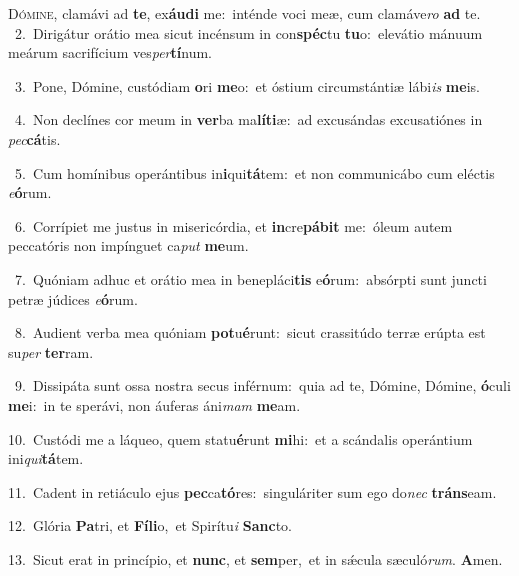\lettrine{\initial\textcolor{\initialcolor}{D}}{ómine,} clamávi ad \textbf{te}\-, ex\-\textbf{áu}\-\textbf{di} me:~\star inténde voci meæ, cum clamáve\textit{ro} \textbf{ad} te.\\
{\numbfont\textcolor{\numbcolor}{~2.}}~Dirigátur orátio mea sicut incénsum in con\-\textbf{spéc}\-tu \textbf{tu}\-o:~\star elevátio mánuum meárum sacrifícium ves\-\textit{per}\-\textbf{tí}num.\par
{\numbfont\textcolor{\numbcolor}{~3.}}~Pone, Dómine, custódiam \textbf{o}\-ri \textbf{me}\-o:~\star et óstium circumstántiæ lábi\textit{is} \textbf{me}\-is.\par
{\numbfont\textcolor{\numbcolor}{~4.}}~Non declínes cor meum in \textbf{ver}\-ba ma\-\textbf{lí}\-\textbf{ti}æ:~\star ad excusándas excusatiónes in \textit{pec}\-\textbf{cá}tis.\par
{\numbfont\textcolor{\numbcolor}{~5.}}~Cum homínibus operántibus in\-\textbf{i}\-qui\-\textbf{tá}\-tem:~\star et non communicábo cum eléctis \textit{e}\-\textbf{ó}rum.\par
{\numbfont\textcolor{\numbcolor}{~6.}}~Corrípiet me justus in misericórdia, et \textbf{in}\-cre\-\textbf{pá}\-\textbf{bit} me:~\star óleum autem peccatóris non impínguet ca\textit{put} \textbf{me}\-um.\par
{\numbfont\textcolor{\numbcolor}{~7.}}~Quóniam adhuc et orátio mea in benepláci\textbf{tis} e\-\textbf{ó}\-rum:~\star absórpti sunt juncti petræ júdices \textit{e}\-\textbf{ó}rum.\par
{\numbfont\textcolor{\numbcolor}{~8.}}~Audient verba mea quóniam \textbf{pot}\-u\-\textbf{é}\-runt:~\star sicut crassitúdo terræ erúpta est su\textit{per} \textbf{ter}\-ram.\par
{\numbfont\textcolor{\numbcolor}{~9.}}~Dissipáta sunt ossa nostra secus inférnum:~\dagger quia ad te, Dómine, Dómine, \textbf{ó}\-culi \textbf{me}\-i:~\star in te sperávi, non áuferas áni\textit{mam} \textbf{me}\-am.\par
{\numbfont\textcolor{\numbcolor}{10.}}~Custódi me a láqueo, quem statu\-\textbf{é}\-runt \textbf{mi}\-hi:~\star et a scándalis operántium ini\-\textit{qui}\-\textbf{tá}tem.\par
{\numbfont\textcolor{\numbcolor}{11.}}~Cadent in retiáculo ejus \textbf{pec}\-ca\-\textbf{tó}\-res:~\star singuláriter sum ego do\textit{nec} \textbf{tráns}\-eam.\par
{\numbfont\textcolor{\numbcolor}{12.}}~Glória \textbf{Pa}\-tri, et \textbf{Fí}\-\textbf{li}o,~\star et Spirítu\textit{i} \textbf{Sanc}\-to.\par
{\numbfont\textcolor{\numbcolor}{13.}}~Sicut erat in princípio, et \textbf{nunc}\-, et \textbf{sem}\-per,~\star et in sǽcula sæculó\-\textit{rum}\-. \textbf{A}\-men.\par
